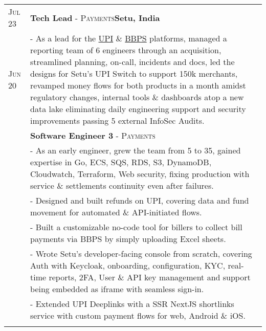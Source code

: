 \documentclass[a4paper,10pt]{extarticle} %
\begin{document}
\begin{tabularx}{\linewidth}{ l | X }

\textsc{Jul 23} & \textbf{Tech Lead} \textsc{- Payments}\hfill\textbf{Setu, India}\\
\textsc{Jun 20} & {- As a lead for the \href{https://setu.co/payments/upi-deeplinks}{UPI} \& \href{https://setu.co/payments/bbps}{BBPS} platforms, managed a reporting team of 6 engineers through an acquisition, streamlined planning, on-call, incidents and docs, led the designs for Setu's UPI Switch to support 150k merchants, revamped money flows for both products in a month amidst regulatory changes, internal tools \& dashboards atop a new data lake eliminating daily engineering support and security improvements passing 5 external InfoSec Audits.}\\
& \textbf{Software Engineer 3} \textsc{- Payments}\\
& {- As an early engineer, grew the team from 5 to 35, gained expertise in Go, ECS, SQS, RDS, S3, DynamoDB, Cloudwatch, Terraform, Web security, fixing production with service \& settlements continuity even after failures.}\\
& {- Designed and built refunds on UPI, covering data and fund movement for automated \& API-initiated flows.}\\
& {- Built a customizable no-code tool for billers to collect bill payments via BBPS by simply uploading Excel sheets.}\\
& {- Wrote Setu's developer-facing console from scratch, covering Auth with Keycloak, onboarding, configuration, KYC, real-time reports, 2FA, User \& API key management and support being embedded as iframe with seamless sign-in.}\\
& {- Extended UPI Deeplinks with a SSR NextJS shortlinks service with custom payment flows for web, Android \& iOS.}\\
\multicolumn{2}{c}{} \\


\end{tabularx}
\end{document}
